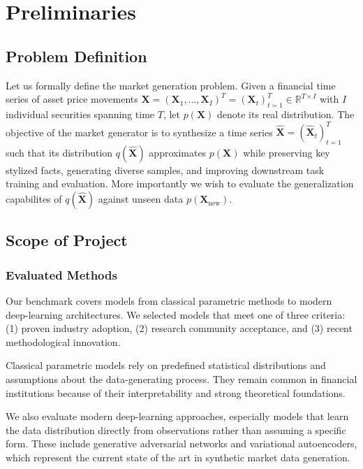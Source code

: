 \section{Preliminaries}
  \subsection{Problem Definition}\label{prelim:definition}
    Let us formally define the market generation problem. Given a
    financial time series of asset price movements
    $\mathbf{X} = (\mathbf{X}_1,\ldots,\mathbf{X}_I)^T = (\mathbf{X}_t)_{t=1}^T\in \mathbb R^{T\times I}$
    with $I$ individual securities spanning time $T$, let $p(\mathbf{X})$ denote
    its real distribution. The objective of the market generator is to
    synthesize a time series $\hat{\mathbf{X}} = (\hat{\mathbf{X}}_t)_{t=1}^T$
    such that its distribution $q(\hat{\mathbf{X}})$ approximates $p(\mathbf{X})$ while
    preserving key stylized facts, generating diverse samples, and
    improving downstream task training and evaluation. More importantly
    we wish to evaluate the generalization capabilites of $q(\hat{\mathbf{X}})$
    against unseen data $p(\mathbf{X}_{\mathrm{new}})$.

  \subsection{Scope of Project}
    \subsubsection{Evaluated Methods}
      Our benchmark covers models from classical parametric methods to
      modern deep-learning architectures. We selected models that meet
      one of three criteria: (1) proven industry adoption, (2) research
      community acceptance, and (3) recent methodological innovation.

      Classical parametric models rely on predefined statistical
      distributions and assumptions about the data-generating process.
      They remain common in financial institutions because of their
      interpretability and strong theoretical foundations.

      We also evaluate modern deep-learning approaches, especially
      models that learn the data distribution directly from
      observations rather than assuming a specific form. These include
      generative adversarial networks and variational autoencoders,
      which represent the current state of the art in synthetic market
      data generation.

